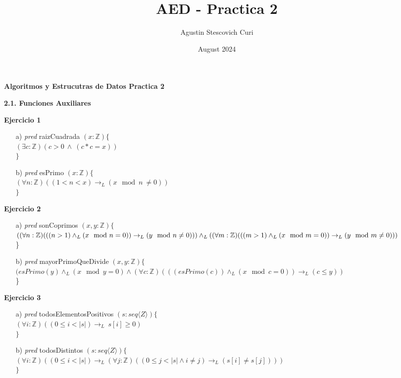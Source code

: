 \documentclass{article}
\title{AED - Practica 2}
\author{Agustin Stescovich Curi}
\date{August 2024}
\begin{document}
\begin{center}
    \Huge{\textbf{Algoritmos y Estrucutras de Datos Practica 2}}
\end{center}

\noindent\huge{\textbf{2.1. Funciones Auxiliares}}

\noindent\LARGE{\textbf{Ejercicio 1}}\\
\begin{itemize}
    \item [a)]  \Large{\textit{pred} raizCuadrada $(x:\mathbb{Z})\{$\\
    $(\exists c:\mathbb{Z})(c>0 \ \land \ (c*c= x))$\\$\}$}
    \item [b)] \Large{\textit{pred} esPrimo $(x:\mathbb{Z})\{$\\
    $(\forall n:\mathbb{Z})((1<n<x)\to_L (x \mod n \ \neq 0))$\\$\}$}
\end{itemize}
\LARGE{\textbf{Ejercicio 2}}
\begin{itemize}
    \item [a)]\Large{\textit{pred} sonCoprimos $(x,y:\mathbb{Z})\{$\\
    $((\forall n:\mathbb{Z})(((n>1) \land_L(x \mod n = 0))\to_L(y \mod n \neq 0)))\land_L\\
    ((\forall m:\mathbb{Z})(((m>1) \land_L(x \mod m = 0))\to_L(y \mod m \neq 0)))$}\\
    \}
    \item[b)] \Large{\textit{pred} mayorPrimoQueDivide $(x,y:\mathbb{Z})\{$\\
    $(esPrimo(y)\land_L(x \mod y = 0)\land(\forall c:\mathbb{Z})(((esPrimo(c))\land_L(x \mod c = 0))\to_L(c\leq y))$\\\}
    }
\end{itemize}
\LARGE{\textbf{Ejercicio 3}}
\begin{itemize}
    \item [a)]  \Large{\textit{pred} todosElementosPositivos $(s:seq\langle Z \rangle)\{$\\
    $(\forall i:\mathbb{Z})((0\leq i < |s|)\to_L \ s[i]\geq0)$\\$\}$}
    
    \item [b)] \large{\textit{pred} todosDistintos $(s:seq\langle Z \rangle)\{$\\
    $(\forall i:\mathbb{Z})((0\leq i < |s|)\to_L (\forall j:\mathbb{Z})((0\leq j < |s| \land i\neq j)\to_L(s[i]\neq s[j])))$\\$\}$}
\end{itemize}
\end{document}
